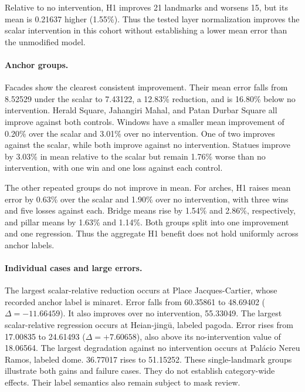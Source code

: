 Relative to no intervention, H1 improves 21 landmarks and worsens 15, but its mean is 0.21637 higher (1.55\%). Thus the tested layer normalization improves the scalar intervention in this cohort without establishing a lower mean error than the unmodified model.

\paragraph{Anchor groups.}
Facades show the clearest consistent improvement. Their mean error falls from 8.52529 under the scalar to 7.43122, a 12.83\% reduction, and is 16.80\% below no intervention. Herald Square, Jahangiri Mahal, and Patan Durbar Square all improve against both controls. Windows have a smaller mean improvement of 0.20\% over the scalar and 3.01\% over no intervention. One of two improves against the scalar, while both improve against no intervention. Statues improve by 3.03\% in mean relative to the scalar but remain 1.76\% worse than no intervention, with one win and one loss against each control.

The other repeated groups do not improve in mean. For arches, H1 raises mean error by 0.63\% over the scalar and 1.90\% over no intervention, with three wins and five losses against each. Bridge means rise by 1.54\% and 2.86\%, respectively, and pillar means by 1.63\% and 1.14\%. Both groups split into one improvement and one regression. Thus the aggregate H1 benefit does not hold uniformly across anchor labels.

\paragraph{Individual cases and large errors.}
The largest scalar-relative reduction occurs at Place Jacques-Cartier, whose recorded anchor label is minaret. Error falls from 60.35861 to 48.69402 ($\Delta=-11.66459$). It also improves over no intervention, 55.33049. The largest scalar-relative regression occurs at Heian-jing\={u}, labeled pagoda. Error rises from 17.00835 to 24.61493 ($\Delta=+7.60658$), also above its no-intervention value of 18.06564. The largest degradation against no intervention occurs at Pal\'acio Nereu Ramos, labeled dome. 36.77017 rises to 51.15252. These single-landmark groups illustrate both gains and failure cases. They do not establish category-wide effects. Their label semantics also remain subject to mask review.

